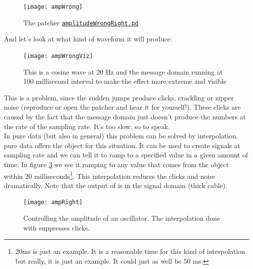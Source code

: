 \begin{figure}[H]
	\centering
	\texttt{[image: ampWrong]}
	\caption[patcher \texttt{amplitudeWrongRight.pd}]
	{The patcher \href{./patchers/00\_introduction/amplitudeWrongRight.pd}{\texttt{amplitudeWrongRight.pd}}}
	\label{fig:label}
\end{figure}


And let's look at what kind of waveform it will produce:

\begin{figure}[H]
	\centering
	\texttt{[image: ampWrongViz]}
	\caption[Amplitude control, message domain ]
	{This is a cosine wave at 20 Hz and the message domain running at 100 millisecond interval to make the effect more extreme and visible}
	\label{fig:label}
\end{figure}


This is a problem, since the sudden jumps produce clicks, crackling or zipper noise (reproduce or open the patcher and hear it for yourself!). These clicks are caused by the fact that the message domain just doesn't produce
the numbers at the rate of the sampling rate. It's too slow, so to speak.\\
In pure data (but also in general) this problem can be solved by interpolation. pure data offers the  object for this situation. It can be used to create signals at sampling rate and we can tell it to ramp to a specified value in a given amount of time. In figure \ref{fig:ampRight} we see it ramping to any value that comes from the  object within 20 milliseconds\footnote{20ms is just an example. It is a reasonable time for this kind of interpolation but really, it is just an example. It could just as well be 50 ms.}. This interpolation reduces the clicks and noise dramatically. Note that the output of  is in the signal domain (thick cable).

\begin{figure}[H]
	\centering
	\texttt{[image: ampRight]}
	\caption[Amplitude control, signal domain]
	{Controlling the amplitude of an oscillator. The interpolation done with  suppresses clicks. }
	\label{fig:ampRight}
\end{figure}


